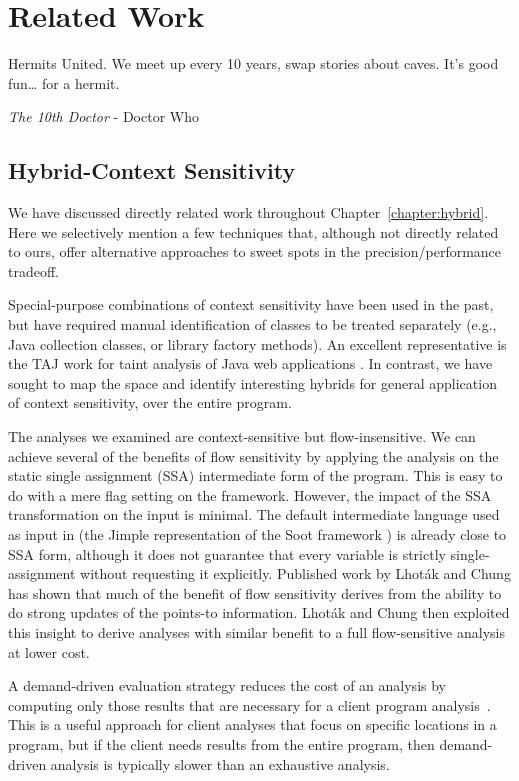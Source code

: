 \chapter{Related Work}
\label{chapter:related}
\epigraph{Hermits United. We meet up every 10 years, swap stories about caves. It’s good fun… for a hermit.}{\textit{The 10th Doctor} - Doctor Who}

\section{Hybrid-Context Sensitivity}

We have discussed directly related work throughout Chapter~\ref{chapter:hybrid}. Here we selectively mention a few techniques that, although not directly related to ours, offer alternative approaches to sweet spots in the precision/performance tradeoff.

Special-purpose combinations of context sensitivity have been used in the past, but have required manual identification of classes to be treated separately (e.g., Java collection classes, or library factory methods). An excellent representative is the TAJ work for taint analysis of Java web applications \cite{pldi:2009:Tripp}. In contrast, we have sought to map the space and identify interesting hybrids for general application of context sensitivity, over the entire program.

The analyses we examined are context-sensitive but flow-insensitive. We can achieve several of the benefits of flow sensitivity by applying the analysis on the static single assignment (SSA) intermediate form of the program. This is easy to do with a mere flag setting on the \doop{} framework. However, the impact of the SSA transformation on the input is minimal. The default intermediate language used as input in \doop{} (the Jimple representation of the Soot framework \cite{cascon:1999:Vall,cc:2000:Vall}) is already close to SSA form, although it does not guarantee that every variable is strictly single-assignment without requesting it explicitly. Published work by Lhot\'{a}k and Chung \cite{popl:2011:Lhotak} has shown that much of the benefit of flow sensitivity derives from the ability to do strong updates of the points-to information. Lhot\'{a}k and Chung then exploited this insight to derive analyses with similar benefit to a full flow-sensitive analysis at lower cost.

A demand-driven evaluation strategy reduces the cost of an analysis by computing only those results that are necessary for a client program analysis~\cite{oopsla:2005:Sridharan,pldi:2006:Sridharan,popl:2008:Zheng,pldi:2001:Heintze}. This is a useful approach for client analyses that focus on specific locations in a program, but if the client needs results from the entire program, then demand-driven analysis is typically slower than an exhaustive analysis.

